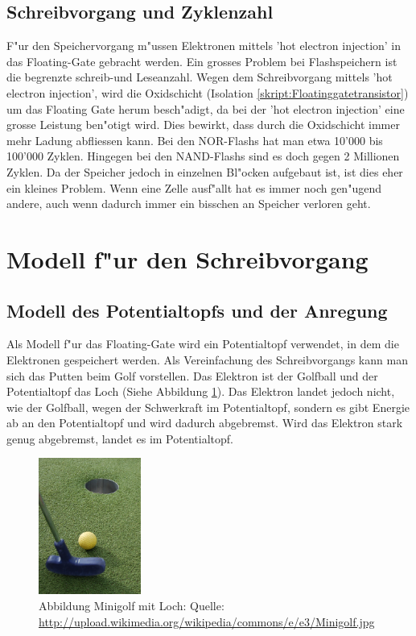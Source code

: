 \begin{refsection}
\subsection{Schreibvorgang und Zyklenzahl}
F"ur den Speichervorgang m"ussen Elektronen mittels 'hot electron injection'
in das Floating-Gate gebracht werden. Ein grosses Problem bei
Flashspeichern ist die begrenzte schreib-und Leseanzahl.
Wegen dem Schreibvorgang mittels 'hot electron injection', wird die
Oxidschicht (Isolation \ref{skript:Floatinggatetransistor}) um das Floating Gate herum
besch"adigt, da bei der 'hot electron injection' eine grosse Leistung
ben"otigt wird.
Dies bewirkt, dass durch die Oxidschicht immer mehr Ladung abfliessen kann.
Bei den NOR-Flashs hat man etwa 10'000 bis 100'000 Zyklen.
Hingegen bei den NAND-Flashs sind es doch gegen 2 Millionen Zyklen.
Da der Speicher jedoch in einzelnen Bl"ocken aufgebaut ist, ist dies
eher ein kleines Problem.
Wenn eine Zelle ausf"allt hat es immer noch gen"ugend andere, auch wenn
dadurch immer ein bisschen an Speicher verloren geht.

\section{Modell f"ur den Schreibvorgang}
\subsection{Modell des Potentialtopfs und der Anregung}
Als Modell f"ur das Floating-Gate wird ein Potentialtopf verwendet,
in dem die Elektronen gespeichert werden.
Als Vereinfachung des Schreibvorgangs kann man sich das Putten beim
Golf vorstellen.
Das Elektron ist der Golfball und der Potentialtopf das Loch (Siehe Abbildung \ref{skript:Minigolf}).
Das Elektron landet jedoch nicht, wie der Golfball, wegen der Schwerkraft
im Potentialtopf, sondern es gibt Energie ab an den Potentialtopf und
wird dadurch abgebremst.
Wird das Elektron stark genug abgebremst, landet es im Potentialtopf.

\begin{figure}
\centering
\includegraphics[width=0.3\textwidth]{flash/graphics/Minigolf.jpg}
\caption{Abbildung Minigolf mit Loch: Quelle:
\url{http://upload.wikimedia.org/wikipedia/commons/e/e3/Minigolf.jpg}
\label{skript:Minigolf}}
\end{figure}


\end{refsection}
